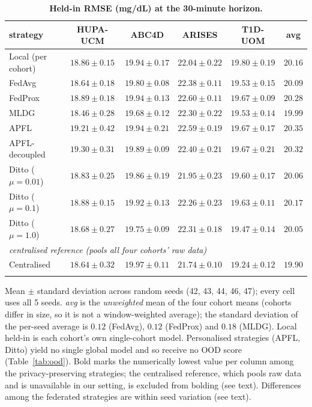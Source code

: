 \documentclass[10pt,letterpaper]{article}
\newlength\savedwidth
\newcommand\thickhline{\noalign{\global\savedwidth\arrayrulewidth\global\arrayrulewidth 2pt}%
\hline
\noalign{\global\arrayrulewidth\savedwidth}}
\begin{document}
\begin{table}[!ht]
\centering
\captionsetup{justification=centering,singlelinecheck=on}
\caption{\bf Held-in RMSE (mg/dL) at the 30-minute horizon.}
\label{tab:main}
\begin{tabular}{lccccc}
\thickhline
strategy & HUPA-UCM & ABC4D & ARISES & T1D-UOM & avg \\
\hline
Local (per cohort) & $18.86 \pm 0.15$ & $19.94 \pm 0.17$ & $22.04 \pm 0.22$ & $19.80 \pm 0.19$ & $20.16$ \\
\hline
FedAvg  & $18.64 \pm 0.18$ & $19.80 \pm 0.08$ & $22.38 \pm 0.11$ & $19.53 \pm 0.15$ & $20.09$ \\
FedProx & $18.89 \pm 0.18$ & $19.94 \pm 0.13$ & $22.60 \pm 0.11$ & $19.67 \pm 0.09$ & $20.28$ \\
MLDG    & $\mathbf{18.46 \pm 0.28}$ & $\mathbf{19.68 \pm 0.12}$ & $22.30 \pm 0.22$ & $19.53 \pm 0.14$ & $\mathbf{19.99}$ \\
\hline
APFL           & $19.21 \pm 0.42$ & $19.94 \pm 0.21$ & $22.59 \pm 0.19$ & $19.67 \pm 0.17$ & $20.35$ \\
APFL-decoupled & $19.30 \pm 0.31$ & $19.89 \pm 0.09$ & $22.40 \pm 0.21$ & $19.67 \pm 0.21$ & $20.32$ \\
Ditto ($\mu{=}0.01$) & $18.83 \pm 0.25$ & $19.86 \pm 0.19$ & $\mathbf{21.95 \pm 0.23}$ & $19.60 \pm 0.17$ & $20.06$ \\
Ditto ($\mu{=}0.1$)  & $18.88 \pm 0.15$ & $19.92 \pm 0.13$ & $22.26 \pm 0.23$ & $19.63 \pm 0.11$ & $20.17$ \\
Ditto ($\mu{=}1.0$)  & $18.68 \pm 0.27$ & $19.75 \pm 0.09$ & $22.31 \pm 0.18$ & $\mathbf{19.47 \pm 0.14}$ & $20.05$ \\
\hline
\multicolumn{6}{l}{\emph{centralised reference (pools all four cohorts' raw data)}} \\
Centralised & $18.64 \pm 0.32$ & $19.97 \pm 0.11$ & $21.74 \pm 0.10$ & $19.24 \pm 0.12$ & $19.90$ \\
\thickhline
\end{tabular}
\begin{center}
{\small Mean $\pm$ standard deviation across random seeds (42, 43, 44, 46, 47);
every cell uses all 5 seeds.
\emph{avg} is the \emph{unweighted} mean of the four cohort means (cohorts differ
in size, so it is not a window-weighted average); the standard deviation of the
per-seed average is $0.12$ (FedAvg), $0.12$ (FedProx) and $0.18$ (MLDG). Local
held-in is each cohort's own single-cohort model. Personalised strategies (APFL,
Ditto) yield no single global model and so receive no OOD score
(Table~\ref{tab:ood}). Bold marks the numerically lowest value per column among
the privacy-preserving strategies; the centralised reference, which pools raw
data and is unavailable in our setting, is excluded from bolding (see text).
Differences among the federated strategies are within seed variation (see text).}
\end{center}
\end{table}
\end{document}

